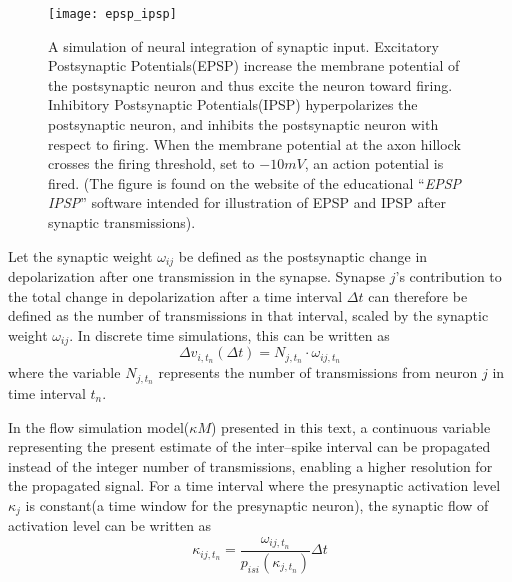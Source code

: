 \begin{figure}[hbt!p]
	\centering
	\texttt{[image: epsp\_ipsp]}
	\caption{A simulation of neural integration of synaptic input. 
			Excitatory Postsynaptic Potentials(EPSP) increase the membrane potential of the postsynaptic neuron and thus excite the neuron toward firing.
			Inhibitory Postsynaptic Potentials(IPSP) hyperpolarizes the postsynaptic neuron, and inhibits the postsynaptic neuron with respect to firing.
			When the membrane potential at the axon hillock crosses the firing threshold, set to $-10mV$, an action potential is fired.
			(The figure is found on the website of the educational ``\emph{EPSP IPSP}'' software intended for illustration of EPSP and IPSP after synaptic transmissions).
				}
	\label{figFigurAvNeuronet}
\end{figure}


	Let the synaptic weight $\omega_{ij}$ be defined as the postsynaptic change in depolarization after one transmission in the synapse.
	Synapse $j$'s contribution to the total change in depolarization after a time interval $\Delta t$ can therefore be defined as the number of transmissions in that interval, scaled by the synaptic weight $\omega_{ij}$.
	In discrete time simulations, this can be written as
	\begin{equation}
		\Delta v_{i, t_n}(\Delta t) = N_{j,t_n}\cdot\omega_{ij, t_n} %
	\end{equation}
	where the variable $N_{j,t_n}$ represents the number of transmissions from neuron $j$ in time interval $t_n$.

	In the flow simulation model($\kappa M$) presented in this text, a continuous variable representing the present estimate of the inter--spike interval can be propagated instead of the integer number of transmissions,
		enabling a higher resolution for the propagated signal.
	For a time interval where the presynaptic activation level $\kappa_j$ is constant(a time window for the presynaptic neuron), the synaptic flow of activation level can be written as
	\begin{equation}
		\kappa_{ij, t_n} = \frac{ \omega_{ij, t_n} }{ p_{isi}(\kappa_{j, t_n}) } \Delta t %
	\end{equation}

